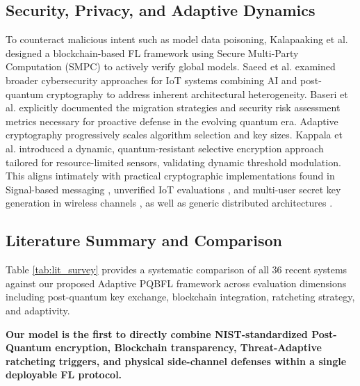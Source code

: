 \documentclass[journal, 10pt, twocolumn]{IEEEtran}
\begin{document}
\subsection{Security, Privacy, and Adaptive Dynamics}
To counteract malicious intent such as model data poisoning, Kalapaaking et al. \cite{kalapaaking2023} designed a blockchain-based FL framework using Secure Multi-Party Computation (SMPC) to actively verify global models. Saeed et al. \cite{saeed2024} examined broader cybersecurity approaches for IoT systems combining AI and post-quantum cryptography to address inherent architectural heterogeneity. Baseri et al. \cite{baseri2025} explicitly documented the migration strategies and security risk assessment metrics necessary for proactive defense in the evolving quantum era. Adaptive cryptography progressively scales algorithm selection and key sizes. Kappala et al. \cite{kappala2026} introduced a dynamic, quantum-resistant selective encryption approach tailored for resource-limited sensors, validating dynamic threshold modulation. This aligns intimately with practical cryptographic implementations found in Signal-based messaging \cite{dincer2022}, unverified IoT evaluations \cite{lopez2025}, and multi-user secret key generation in wireless channels \cite{aygul2025}, as well as generic distributed architectures \cite{nezhadsistani2025}. 

\subsection{Literature Summary and Comparison}
\label{subsec:lit_comparison}

Table \ref{tab:lit_survey} provides a systematic comparison of all 36 recent systems against our proposed Adaptive PQBFL framework across evaluation dimensions including post-quantum key exchange, blockchain integration, ratcheting strategy, and adaptivity. 

\textbf{Our model is the first to directly combine NIST-standardized Post-Quantum encryption, Blockchain transparency, Threat-Adaptive ratcheting triggers, and physical side-channel defenses within a single deployable FL protocol.}
\end{document}

